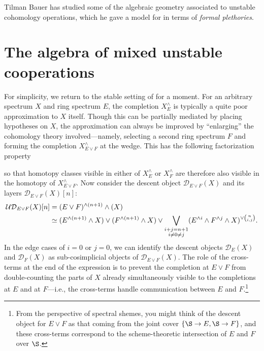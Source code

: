 \begin{remark}
Tilman Bauer has studied some of the algebraic geometry associated to unstable cohomology operations, which he gave a model for in terms of \textit{formal plethories}.
\end{remark}










\section{The algebra of mixed unstable cooperations}\label{UnstableAlgebraicModelSection}

For simplicity, we return to the stable setting of  for a moment.  For an arbitrary spectrum $X$ and ring spectrum $E$, the completion $X^\wedge_E$ is typically a quite poor approximation to $X$ itself.  Though this can be partially mediated by placing hypotheses on $X$, the approximation can always be improved by ``enlarging'' the cohomology theory involved---namely, selecting a second ring spectrum $F$ and forming the completion $X^\wedge_{E \vee F}$ at the wedge.  This has the following factorization property
\begin{center}
\end{center}
so that homotopy classes visible in either of $X^\wedge_E$ or $X^\wedge_F$ are therefore also visible in the homotopy of $X^\wedge_{E \vee F}$.  Now consider the descent object $\mathcal D_{E \vee F}(X)$ and its layers $\mathcal D_{E \vee F}(X)[n]$:
\begin{align*}
\mathcal{UD}_{E \vee F}(X)[n] & = (E \vee F)^{\wedge (n+1)} \wedge (X) \\
& \simeq (E^{\wedge (n+1)} \wedge X) \vee (F^{\wedge (n+1)} \wedge X) \vee \bigvee_{\substack{i+j=n+1 \\ i \ne 0 \ne j}} (E^{\wedge i} \wedge F^{\wedge j} \wedge X)^{\vee \binom{n}{i,j}}.
\end{align*}
In the edge cases of $i = 0$ or $j = 0$, we can identify the descent objects $\mathcal D_E(X)$ and $\mathcal D_F(X)$ as sub-cosimplicial objects of $\mathcal D_{E \vee F}(X)$.  The role of the cross-terms at the end of the expression is to prevent the completion at $E \vee F$ from double-counting the parts of $X$ already simultaneously visible to the completions at $E$ and at $F$---i.e., the cross-terms handle communication between $E$ and $F$.\footnote{From the perspective of spectral shemes, you might think of the descent object for $E \vee F$ as that coming from the joint cover $\{\S \to E, \S \to F\}$, and these cross-terms correspond to the scheme-theoretic intersection of $E$ and $F$ over $\S$.}

